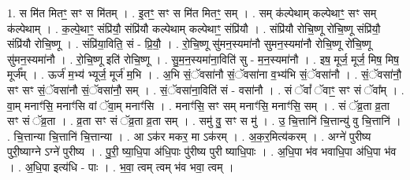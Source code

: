 \documentclass[17pt]{extarticle}
\begin{document}
1. स मि॑त मितꣳ॒॒ सꣳ स मि॑तम् । . इ॒तꣳ॒॒ सꣳ स मि॑त मितꣳ॒॒ सम् । . सम् क॑ल्पेथाम् कल्पेथाꣳ॒॒ सꣳ सम् क॑ल्पेथाम् । . क॒ल्पे॒थाꣳ॒॒ संप्रि॑यौ॒ संप्रि॑यौ कल्पेथाम् कल्पेथाꣳ॒॒ संप्रि॑यौ । . संप्रि॑यौ रोचि॒ष्णू रो॑चि॒ष्णू संप्रि॑यौ॒ संप्रि॑यौ रोचि॒ष्णू । . संप्रि॑या॒विति॒ सं - प्रि॒यौ॒ । . रो॒चि॒ष्णू सु॑मन॒स्यमा॑नौ सुमन॒स्यमा॑नौ रोचि॒ष्णू रो॑चि॒ष्णू सु॑मन॒स्यमा॑नौ । . रो॒चि॒ष्णू इति॑ रोचि॒ष्णू । . सु॒म॒न॒स्यमा॑ना॒विति॑ सु - म॒न॒स्यमा॑नौ । . इष॒ मूर्ज॒ मूर्ज॒ मिष॒ मिष॒ मूर्ज᳚म् । . ऊर्ज॑ म॒भ्य॑ भ्यूर्ज॒ मूर्ज॑ म॒भि । . अ॒भि सं॒ॅवसा॑नौ सं॒ॅवसा॑ना व॒भ्य॑भि सं॒ॅवसा॑नौ । . सं॒ॅवसा॑नौ॒ सꣳ सꣳ सं॒ॅवसा॑नौ सं॒ॅवसा॑नौ॒ सम् । . सं॒ॅवसा॑ना॒विति॑ सं - वसा॑नौ । . सं ॅवां᳚ ॅवाꣳ॒॒ सꣳ सं ॅवा᳚म् । . वा॒म् मनाꣳ॑सि॒ मनाꣳ॑सि वां ॅवा॒म् मनाꣳ॑सि । . मनाꣳ॑सि॒ सꣳ सम् मनाꣳ॑सि॒ मनाꣳ॑सि॒ सम् । . सं ॅव्र॒ता व्र॒ता सꣳ सं ॅव्र॒ता । . व्र॒ता सꣳ सं ॅव्र॒ता व्र॒ता सम् । . समु॑ वु॒ सꣳ स मु॑ । . उ॒ चि॒त्तानि॑ चि॒त्तान्यु॑ वु चि॒त्तानि॑ । . चि॒त्तान्या चि॒त्तानि॑ चि॒त्तान्या । . आ ऽक॑र मकर॒ मा ऽक॑रम् । . अ॒क॒र॒मित्य॑करम् । . अग्ने॑ पुरीष्य पुरी॒ष्याग्ने ऽग्ने॑ पुरीष्य । . पु॒री॒ ष्या॒धि॒पा अ॑धि॒पाः पु॑रीष्य पुरी ष्याधि॒पाः । . अ॒धि॒पा भ॑व भवाधि॒पा अ॑धि॒पा भ॑व । . अ॒धि॒पा इत्य॑धि - पाः । . भ॒वा॒ त्वम् त्वम् भ॑व भवा॒ त्वम् । \newline
\end{document}
